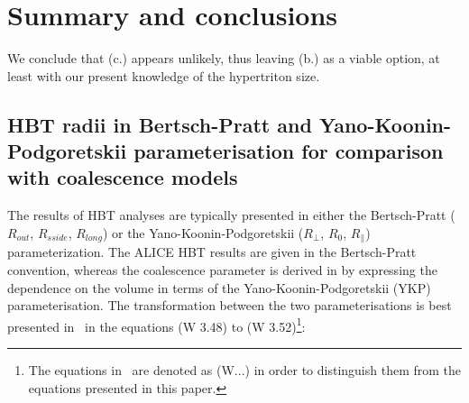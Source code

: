 \documentclass[a4paper,11pt]{scrartcl} %
\begin{document}
\section{Summary and conclusions}

We conclude that (c.) appears unlikely, thus leaving (b.) as a viable option, at least with our present knowledge of the hypertriton size.



\begin{appendix}
\section{HBT radii in Bertsch-Pratt and Yano-Koonin-Podgoretskii parameterisation for comparison with coalescence models}
The results of HBT analyses are typically presented in either the Bertsch-Pratt ($R_{out}$, $R_{sside}$, $R_{long}$) or the Yano-Koonin-Podgoretskii ($R_{\perp}$, $R_{0}$, $R_{\parallel}$) parameterization. The ALICE HBT results \cite{Aamodt:2011mr, Adam:2015pwa} are given in the Bertsch-Pratt convention, whereas the coalescence parameter is derived in \cite{Scheibl:1998tk} by expressing the dependence on the volume in terms of the Yano-Koonin-Podgoretskii (YKP) parameterisation. 
The transformation between the two parameterisations is best presented in~\cite{Wiedemann:1999qn} in the equations (W 3.48) to (W 3.52)\footnote{The equations in~\cite{Wiedemann:1999qn} are denoted as (W...) in order to distinguish them from the equations presented in this paper.}:


\end{appendix}
\end{document}
